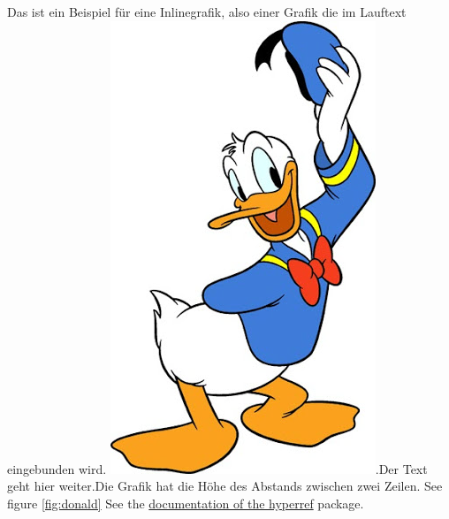 \documentclass[12pt, twocolumn]{article}
\begin{document}
Das ist ein Beispiel für eine Inlinegrafik, also einer Grafik die im Lauftext eingebunden wird. \includegraphics[height=\baselineskip]{Donald.png}.Der Text geht hier weiter.Die Grafik hat die Höhe des Abstands zwischen zwei Zeilen. 
See figure \ref{fig:donald}
See the \href{https://ctan.org/pkg/hyperref?lang=de}{documentation of the hyperref} package.
\end{document}
